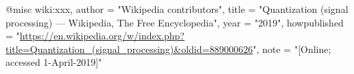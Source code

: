 @misc{ wiki:xxx,
    author = "{Wikipedia contributors}",
    title = "Quantization (signal processing) --- {Wikipedia}{,} The Free Encyclopedia",
    year = "2019",
    howpublished = "\url{https://en.wikipedia.org/w/index.php?title=Quantization_(signal_processing)&oldid=889000626}",
    note = "[Online; accessed 1-April-2019]"
  }